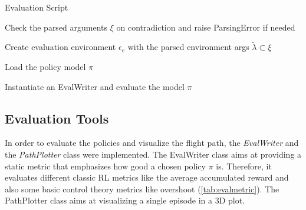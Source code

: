 \begin{algorithm}
	\caption{Evaluation Script}
	\label{alg:eval}
	Check the parsed arguments $\xi$ on contradiction and raise ParsingError if needed
	
	Create evaluation environment $\epsilon_e$ with the parsed environment args $\tilde{\lambda} \subset \xi$
	
	Load the policy model $\pi$
	
	Instantiate an EvalWriter and evaluate the model $\pi$
	


\end{algorithm}

\newpage

\newpage

\subsection{Evaluation Tools} \label{sec:tools}
In order to evaluate the policies and visualize the flight path, the \emph{EvalWriter} and the \emph{PathPlotter} class were implemented.
The EvalWriter class aims at providing a static metric that emphasizes how good a chosen policy $\pi$ is. 
Therefore, it evaluates different classic RL metrics like the average accumulated reward and also some basic control theory metrics like overshoot (\cref{tab:evalmetric}).
The PathPlotter class aims at visualizing a single episode in a 3D plot.

